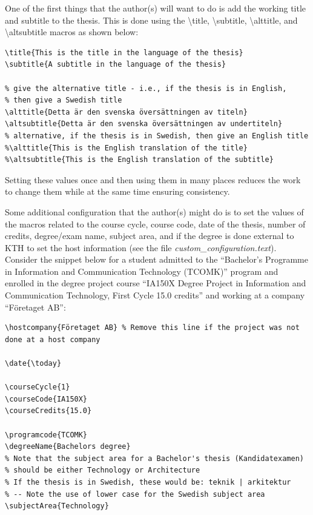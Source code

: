 \documentclass[examplethesis.tex]{subfiles}
\begin{document}
One of the first things that the author(s) will want to do is add the working title and subtitle to the thesis. This is done using the \textbackslash title, \textbackslash subtitle, \textbackslash alttitle, and \textbackslash altsubtitle macros as shown below:
\begin{lstlisting}[style=latexExampleForAuthors]
\title{This is the title in the language of the thesis}
\subtitle{A subtitle in the language of the thesis}

% give the alternative title - i.e., if the thesis is in English,
% then give a Swedish title
\alttitle{Detta är den svenska översättningen av titeln}
\altsubtitle{Detta är den svenska översättningen av undertiteln}
% alternative, if the thesis is in Swedish, then give an English title
%\alttitle{This is the English translation of the title}
%\altsubtitle{This is the English translation of the subtitle}   
\end{lstlisting}

Setting these values once and then using them in many places reduces the work to change them while at the same time ensuring consistency. 

Some additional configuration that the author(s) might do is to set the values of the macros related to the course cycle, course code, date of the thesis, number of credits, degree/exam name, subject area, and if the degree is done external to KTH to set the host information (see the file \textit{custom\_configuration.text}). Consider the snippet below for a student admitted to the ``Bachelor's Programme in Information and Communication Technology (TCOMK)'' program and enrolled in the degree project course ``IA150X Degree Project in Information and Communication Technology, First Cycle 15.0 credits'' and working at a company ``Företaget AB'':
\begin{lstlisting}[style=latexExampleForAuthors]
\hostcompany{Företaget AB} % Remove this line if the project was not done at a host company

\date{\today}

\courseCycle{1}
\courseCode{IA150X}
\courseCredits{15.0}

\programcode{TCOMK}
\degreeName{Bachelors degree}
% Note that the subject area for a Bachelor's thesis (Kandidatexamen)
% should be either Technology or Architecture
% If the thesis is in Swedish, these would be: teknik | arkitektur
% -- Note the use of lower case for the Swedish subject area
\subjectArea{Technology}
\end{lstlisting}
\end{document}

